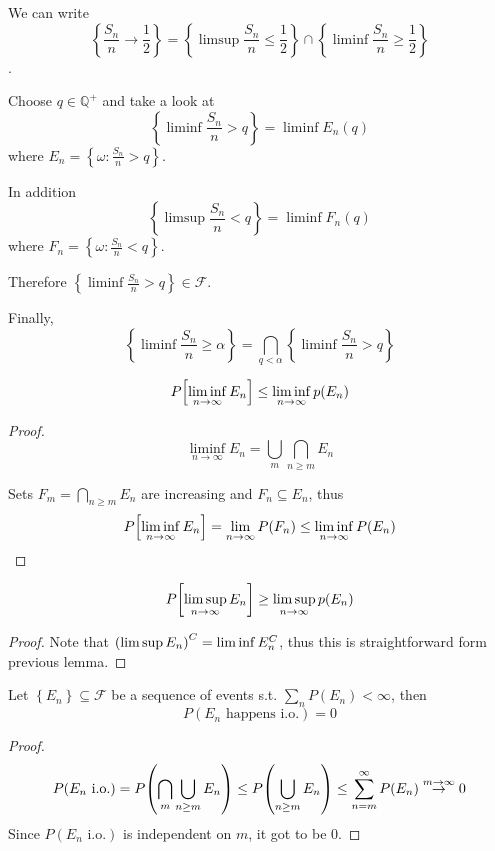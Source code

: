 We can write
$$\left\{ \frac{S_n}{n} \to \frac{1}{2} \right\} = \left\{ \limsup \frac{S_n}{n} \leq \frac{1}{2} \right\} \cap \left\{ \liminf \frac{S_n}{n} \geq \frac{1}{2} \right\}$$.

Choose $q\in \mathbb{Q}^+$ and take a look at $$\left\{ \liminf \frac{S_n}{n} > q \right\} = \liminf E_n(q)$$
where $E_n = \left\{ \omega  : \frac{S_n}{n} > q \right\}$.

In addition
$$\left\{ \limsup \frac{S_n}{n} < q \right\} = \liminf F_n(q)$$
where $F_n = \left\{ \omega  : \frac{S_n}{n} < q \right\}$.

Therefore
$\left\{ \liminf \frac{S_n}{n} > q \right\} \in \mathcal{F}$.


Finally,
$$\left\{ \liminf \frac{S_n}{n} \geq \alpha \right\} = \bigcap_{q<\alpha} \left\{ \liminf \frac{S_n}{n} > q \right\} $$



\begin{lemma}
	$$P\qty[\liminf_{n\to \infty} E_n] \leq \liminf_{n\to \infty} p\qty(E_n)$$
	
	\begin{proof}
		$$\liminf_{n\to \infty} E_n = \bigcup_m \bigcap_{n\geq m} E_n $$
		
		Sets $F_m= \bigcap_{n\geq m} E_n $ are increasing and $F_n \subseteq E_n$, thus
		$$P\qty[\liminf_{n\to \infty} E_n] = \lim_{n\to \infty} P(F_n) \leq \liminf_{n\to \infty} P(E_n)  $$
	\end{proof} 
\end{lemma}


\begin{lemma} \label{fatou}
	$$P\qty[\limsup_{n\to \infty} E_n] \geq \limsup_{n\to \infty} p\qty(E_n)$$
	
	\begin{proof}
		Note that $\qty(\limsup E_n)^C = \liminf E_n^C$, thus this is straightforward form previous lemma.
	\end{proof} 
\end{lemma}

\begin{lemma} \label{bc1}
	Let $\left\{ E_n\right\} \subseteq \mathcal{F}$ be a sequence of events s.t. $\sum_n P(E_n) < \infty$, then
	$$P(E_n \text{ happens i.o.}) =0$$
	
	\begin{proof}
		$$P(E_n \text{ i.o.}) = P\qty(\bigcap_m \bigcup_{n\geq m} E_n) \leq  P\qty( \bigcup_{n\geq m} E_n) \leq \sum_{n=m}^\infty P(E_n) \stackrel{m\to \infty}{\to} 0$$
		Since $P(E_n \text{ i.o.})$ is independent on $m$, it got to be $0$.
	\end{proof}
\end{lemma}

